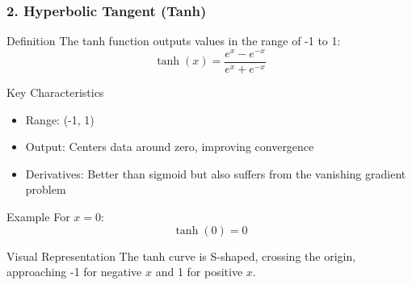 \documentclass[aspectratio=169]{beamer}
\begin{document}
\begin{frame}[fragile]
    \frametitle{2. Hyperbolic Tangent (Tanh)}
    \begin{block}{Definition}
        The tanh function outputs values in the range of -1 to 1:
        \begin{equation}
            \tanh(x) = \frac{e^{x} - e^{-x}}{e^{x} + e^{-x}}
        \end{equation}
    \end{block}

    \begin{block}{Key Characteristics}
        \begin{itemize}
            \item Range: (-1, 1)
            \item Output: Centers data around zero, improving convergence
            \item Derivatives: Better than sigmoid but also suffers from the vanishing gradient problem
        \end{itemize}
    \end{block}

    \begin{block}{Example}
        For \( x = 0 \):
        \begin{equation}
            \tanh(0) = 0
        \end{equation}
    \end{block}
    
    \begin{block}{Visual Representation}
        The tanh curve is S-shaped, crossing the origin, approaching -1 for negative \( x \) and 1 for positive \( x \).
    \end{block}
\end{frame}
\end{document}
